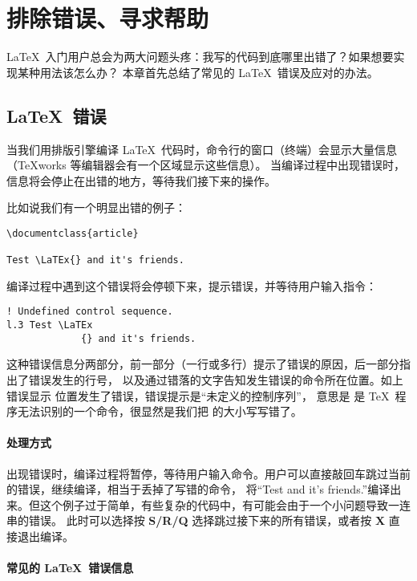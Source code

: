 \chapter{排除错误、寻求帮助}\label{chap:error-helps}

\begin{intro}
\LaTeX\ 入门用户总会为两大问题头疼：我写的代码到底哪里出错了？如果想要实现某种用法该怎么办？
本章首先总结了常见的 \LaTeX\ 错误及应对的办法。
\end{intro}

\section{\LaTeX\ 错误}\label{sec:errors}

当我们用排版引擎编译 \LaTeX\ 代码时，命令行的窗口（终端）会显示大量信息（\TeX works 等编辑器会有一个区域显示这些信息）。
当编译过程中出现错误时，信息将会停止在出错的地方，等待我们接下来的操作。

比如说我们有一个明显出错的例子：
\begin{verbatim}
\documentclass{article}

Test \LaTEx{} and it's friends.

\end{verbatim}

编译过程中遇到这个错误将会停顿下来，提示错误，并等待用户输入指令：
\begin{verbatim}
! Undefined control sequence.
l.3 Test \LaTEx
             {} and it's friends.
\end{verbatim}

这种错误信息分两部分，前一部分（一行或多行）提示了错误的原因，后一部分指出了错误发生的行号，
以及通过错落的文字告知发生错误的命令所在位置。如上错误显示  位置发生了错误，错误提示是“未定义的控制序列”，
意思是  是 \TeX\ 程序无法识别的一个命令，很显然是我们把  的大小写写错了。

\subsubsection{处理方式}

出现错误时，编译过程将暂停，等待用户输入命令。用户可以直接敲回车跳过当前的错误，继续编译，相当于丢掉了写错的命令，
将``Test and it's friends.''编译出来。但这个例子过于简单，有些复杂的代码中，有可能会由于一个小问题导致一连串的错误。
此时可以选择按 \textbf{S/R/Q} 选择跳过接下来的所有错误，或者按 \textbf{X} 直接退出编译。

\subsubsection{常见的 \LaTeX\ 错误信息}

